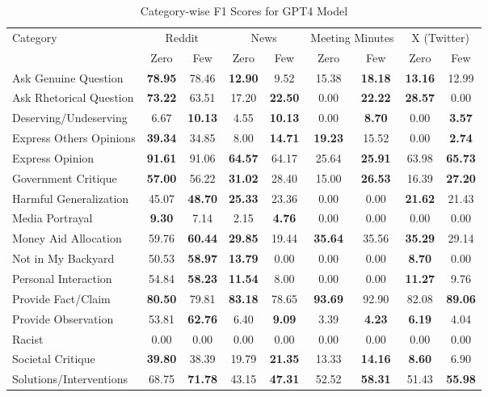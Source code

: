 \begin{table*}[htbp]
\centering
\begin{tabular}{l *{8}{c}}
\toprule
Category & \multicolumn{2}{c}{Reddit} & \multicolumn{2}{c}{News} & \multicolumn{2}{c}{Meeting Minutes} & \multicolumn{2}{c}{X (Twitter)} \\
& Zero & Few & Zero & Few & Zero & Few & Zero & Few \\
\midrule
Ask Genuine Question & \textbf{78.95} & 78.46 & \textbf{12.90} & 9.52 & 15.38 & \textbf{18.18} & \textbf{13.16} & 12.99 \\
Ask Rhetorical Question & \textbf{73.22} & 63.51 & 17.20 & \textbf{22.50} & 0.00 & \textbf{22.22} & \textbf{28.57} & 0.00 \\
Deserving/Undeserving & 6.67 & \textbf{10.13} & 4.55 & \textbf{10.13} & 0.00 & \textbf{8.70} & 0.00 & \textbf{3.57} \\
Express Others Opinions & \textbf{39.34} & 34.85 & 8.00 & \textbf{14.71} & \textbf{19.23} & 15.52 & 0.00 & \textbf{2.74} \\
Express Opinion & \textbf{91.61} & 91.06 & \textbf{64.57} & 64.17 & 25.64 & \textbf{25.91} & 63.98 & \textbf{65.73} \\
Government Critique & \textbf{57.00} & 56.22 & \textbf{31.02} & 28.40 & 15.00 & \textbf{26.53} & 16.39 & \textbf{27.20} \\
Harmful Generalization & 45.07 & \textbf{48.70} & \textbf{25.33} & 23.36 & 0.00 & 0.00 & \textbf{21.62} & 21.43 \\
Media Portrayal & \textbf{9.30} & 7.14 & 2.15 & \textbf{4.76} & 0.00 & 0.00 & 0.00 & 0.00 \\
Money Aid Allocation & 59.76 & \textbf{60.44} & \textbf{29.85} & 19.44 & \textbf{35.64} & 35.56 & \textbf{35.29} & 29.14 \\
Not in My Backyard & 50.53 & \textbf{58.97} & \textbf{13.79} & 0.00 & 0.00 & 0.00 & \textbf{8.70} & 0.00 \\
Personal Interaction & 54.84 & \textbf{58.23} & \textbf{11.54} & 8.00 & 0.00 & 0.00 & \textbf{11.27} & 9.76 \\
Provide Fact/Claim & \textbf{80.50} & 79.81 & \textbf{83.18} & 78.65 & \textbf{93.69} & 92.90 & 82.08 & \textbf{89.06} \\
Provide Observation & 53.81 & \textbf{62.76} & 6.40 & \textbf{9.09} & 3.39 & \textbf{4.23} & \textbf{6.19} & 4.04 \\
Racist & 0.00 & 0.00 & 0.00 & 0.00 & 0.00 & 0.00 & 0.00 & 0.00 \\
Societal Critique & \textbf{39.80} & 38.39 & 19.79 & \textbf{21.35} & 13.33 & \textbf{14.16} & \textbf{8.60} & 6.90 \\
Solutions/Interventions & 68.75 & \textbf{71.78} & 43.15 & \textbf{47.31} & 52.52 & \textbf{58.31} & 51.43 & \textbf{55.98} \\
\bottomrule
\end{tabular}
\caption{Category-wise F1 Scores for GPT4 Model}
\label{tab:gpt4_category_breakdown}
\end{table*}